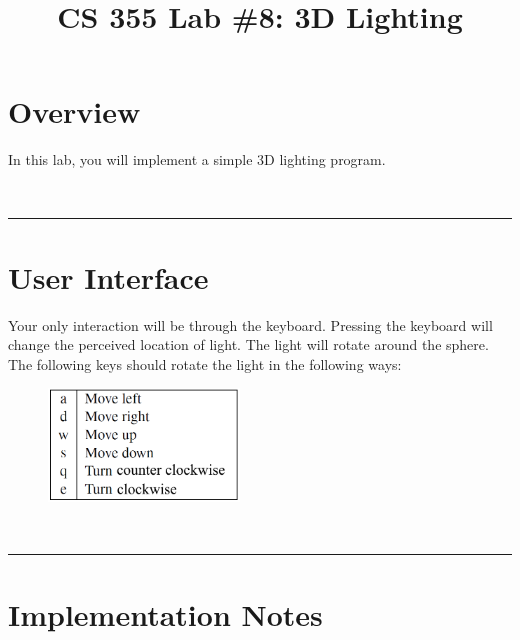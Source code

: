 \documentclass[11pt]{article}
\title{\vspace{-0.5in}CS 355 Lab \#8: 3D Lighting}
\date{\vspace{-0.25in}}
\newif\ifinstructor
\begin{document}
\maketitle

\newcommand{\mat}[1]{\mathbf #1}
\renewcommand{\vec}[1]{\mathbf #1}
\newcommand{\x}{\vec{x}}
\newcommand{\y}{\vec{y}}
\newcommand{\p}{\vec{p}}
\renewcommand{\c}{\vec{c}}

\newcommand{\note}[1]{\textcolor{red}{NOTE: #1}}
\newcommand{\divider}{\bigskip ~ \hrule}

\vspace{-0.5in}

\ifinstructor
Time to complete: 1 week ramp-up plus 1 week to actually do.
\fi

\section*{Overview}

In this lab, you will implement a simple 3D lighting program. 

\divider

\section*{User Interface}

Your only interaction will be through the keyboard. Pressing the keyboard will change the perceived location of light. The light will rotate around the sphere. The following keys should rotate the light in the following ways:

\begin{figure}[!hbt]
	\begin{center}
		\includegraphics[width=2in]{keys.png}
	\end{center}
	\label{fig:screenshot}
\end{figure}

\divider

\section*{Implementation Notes}
\end{document}
